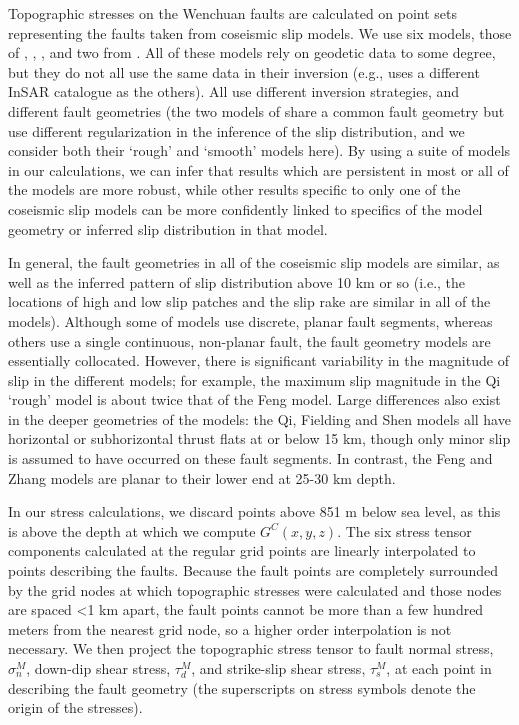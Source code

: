 \documentclass[draft,jgrga]{AGUTeX}
\begin{document}
\begin{article}
Topographic stresses on the Wenchuan faults are calculated on point sets
representing the faults taken from coseismic slip models. We use six models,
those of \citet{shen2009}, \citet{feng2010}, \citet{zhang2011},
\citet{fielding2013} and two from \citet{qi2011}.
All of these models rely on geodetic data to some degree, but they do not all 
use the same data in their inversion (e.g., \citep{feng2010} uses a different
InSAR catalogue as the others). All use different inversion strategies, and
different fault geometries (the two models of \citep{qi2011} share a common
fault geometry but use different regularization in the inference of the slip
distribution, and we consider both their `rough' and `smooth' models here). By using a suite of models in our calculations, we can infer
that results which are persistent in most or all of the models are more robust,
while other results specific to only one of the coseismic slip models can be
more confidently linked to specifics of the model geometry or inferred slip
distribution in that model. 

In general, the fault geometries in all of the coseismic slip models are
similar, as well as the inferred pattern of slip distribution above 10 km or
so (i.e., the locations of high and low slip patches and the slip rake are
similar in all of the models).  Although some of models use discrete, planar
fault segments, whereas others use a single continuous, non-planar fault, the
fault geometry models are essentially collocated. However, there is significant
variability in the magnitude of slip in the different models; for example, the
maximum slip magnitude in the Qi `rough' model is about twice that of the
Feng model. Large differences also exist in the deeper geometries of the
models: the Qi, Fielding and Shen models all have horizontal or subhorizontal
thrust flats at or below 15 km, though only minor slip is assumed to have
occurred on these fault segments. In contrast, the Feng and Zhang models are
planar to their lower end at 25-30 km depth.

In our stress calculations, we discard
points above 851 m below sea level, as this is above the depth at which
we compute $G^C(x,y,z)$. The six stress tensor components calculated at
the regular grid points are linearly interpolated to points describing
the faults. Because the fault points are completely surrounded by the
grid nodes at which topographic stresses were calculated and those nodes
are spaced \textless{}1 km apart, the fault points cannot be more than a
few hundred meters from the nearest grid node, so a higher order
interpolation is not necessary. We then project the topographic stress
tensor to fault normal stress, $\sigma_n^M$, down-dip shear stress,
$\tau_d^M$, and strike-slip shear stress, $\tau_s^M$, at each point in
describing the fault geometry (the superscripts on stress
symbols denote the origin of the stresses).


\end{article}
\end{document}

